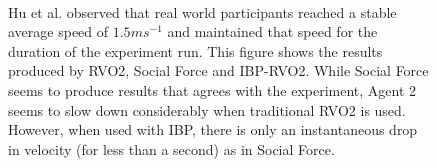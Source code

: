 \begin{figure}[!b]
  \centering
   \\
   \hspace{1pt}
  \caption[Speed plot comparison]{Hu et al. observed that real world participants reached a stable average speed of $1.5 ms^{-1}$ and maintained that speed for the duration of the experiment run. This figure shows the results produced by RVO2, Social Force and IBP-RVO2. While Social Force seems to produce results that agrees with the experiment, Agent 2 seems to slow down considerably when traditional RVO2 is used. However, when used with IBP, there is only an instantaneous drop in velocity (for less than a second) as in Social Force.}
  \label{fig:SpeedIBPPlot}
\end{figure}

